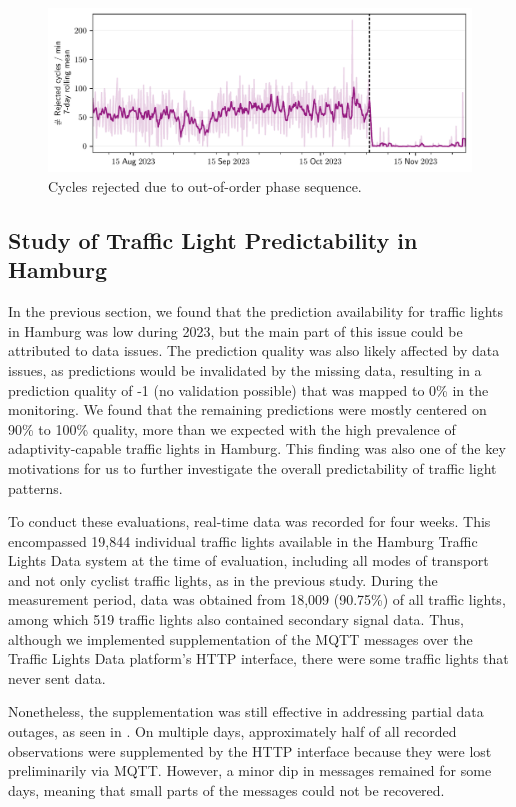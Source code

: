 \begin{figure}[t]
    \centering
    \includegraphics[width=\linewidth]{images/monitoring-rejected-cycles.pdf}
    \caption{Cycles rejected due to out-of-order phase sequence.}\label{fig:monitoring-rejected-cycles}
\end{figure}

\subsection{Study of Traffic Light Predictability in Hamburg}

In the previous section, we found that the prediction availability for traffic lights in Hamburg was low during 2023, but the main part of this issue could be attributed to data issues. The prediction quality was also likely affected by data issues, as predictions would be invalidated by the missing data, resulting in a prediction quality of -1 (no validation possible) that was mapped to 0\% in the monitoring. We found that the remaining predictions were mostly centered on 90\% to 100\% quality, more than we expected with the high prevalence of adaptivity-capable traffic lights in Hamburg. This finding was also one of the key motivations for us to further investigate the overall predictability of traffic light patterns. 

To conduct these evaluations, real-time data was recorded for four weeks. This encompassed 19,844 individual traffic lights available in the Hamburg Traffic Lights Data system at the time of evaluation, including all modes of transport and not only cyclist traffic lights, as in the previous study. During the measurement period, data was obtained from 18,009 (90.75\%) of all traffic lights, among which 519 traffic lights also contained secondary signal data. Thus, although we implemented supplementation of the MQTT messages over the Traffic Lights Data platform's HTTP interface, there were some traffic lights that never sent data.

Nonetheless, the supplementation was still effective in addressing partial data outages, as seen in . On multiple days, approximately half of all recorded observations were supplemented by the HTTP interface because they were lost preliminarily via MQTT. However, a minor dip in messages remained for some days, meaning that small parts of the messages could not be recovered.


